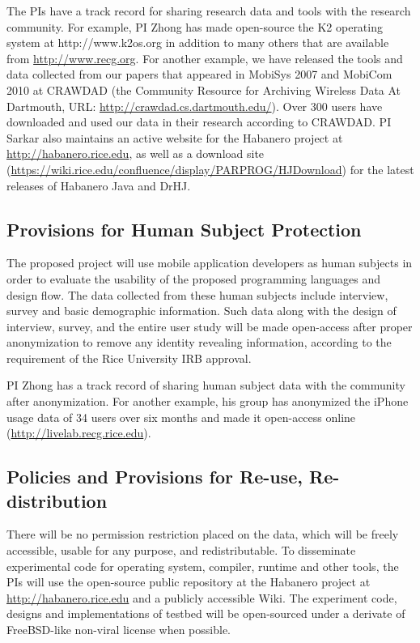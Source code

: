 The PIs have a track record for sharing research data and tools with the research community. For example, PI Zhong has made open-source the K2 operating system at http://www.k2os.org in addition to many others that are available from \url{http://www.recg.org}. For another example, we have released the tools and data collected from our papers that appeared in MobiSys 2007 and MobiCom 2010 at CRAWDAD (the Community Resource for Archiving Wireless Data At Dartmouth, URL: \url{http://crawdad.cs.dartmouth.edu/}). Over 300 users have downloaded and used our data in their research according to CRAWDAD. PI Sarkar also maintains an active website for the Habanero project at \url{http://habanero.rice.edu}, as well as a download site (\url{https://wiki.rice.edu/confluence/display/PARPROG/HJDownload}) for the  latest releases of Habanero Java and DrHJ.

\subsection*{Provisions for Human Subject Protection}
The proposed project will use mobile application developers as human subjects in order to evaluate the usability of the proposed programming languages and design flow. The data collected from these human subjects include interview, survey and basic demographic information. Such data along with the design of interview, survey, and the entire user study will be made open-access after proper anonymization to remove any identity revealing information, according to the requirement of the Rice University IRB approval. 

PI Zhong has a track record of sharing human subject data with the community after anonymization. For another example, his group has anonymized the iPhone usage data of 34 users over six months and made it open-access online (\url{http://livelab.recg.rice.edu}).  


\subsection*{Policies and Provisions for Re-use, Re-distribution}

There will be no permission restriction placed on the data, which will be freely accessible, usable for any purpose, and redistributable. To disseminate experimental code for operating system, compiler, runtime and other tools, the PIs will use the open-source public repository at the Habanero project at \url{http://habanero.rice.edu} and a publicly accessible Wiki. The experiment code, designs and implementations of testbed will be open-sourced under a derivate of FreeBSD-like non-viral license when possible. 


